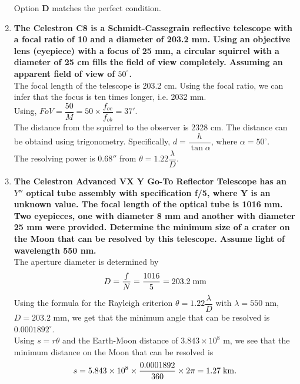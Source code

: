 \documentclass[a4paper,12pt]{extarticle}
\begin{document}
\begin{enumerate}
Option \textbf{D} matches the perfect condition.

\item \textbf{The Celestron C8 is a Schmidt-Cassegrain reflective telescope with a focal ratio of 10 and a diameter of 203.2 mm. Using an objective lens (eyepiece) with a focus of 25 mm, a circular squirrel with a diameter of 25 cm fills the field of view completely. Assuming an apparent field of view of $50^\circ$.}\\

The focal length of the telescope is 203.2 cm. Using the focal ratio, we can infer that the focus is ten times longer, i.e.
2032 mm.\\

Using, $FoV =\dfrac{50}{M}=50\times \dfrac{f_{oc}}{f_{ob}}=37'$.\\

The distance from the squirrel to the observer is 2328 cm. The distance can be obtaind using trigonometry. Specifically, $d=\dfrac{h}{\tan \alpha}$, where $\alpha = 50^\circ$.\\

The resolving power is $0.68''$ from $\theta =1.22\dfrac{\lambda}{D}$. \\

\item \textbf{The Celestron Advanced VX Y Go-To Reflector Telescope has an $Y''$ optical tube assembly with specification f/5, where Y is an unknown value. The focal length of the optical tube is 1016 mm. Two eyepieces, one with diameter 8 mm and another with diameter 25 mm were provided. Determine the minimum size of a crater on the Moon that can be resolved by this telescope. Assume light of wavelength 550 nm.}\\

The aperture diameter is determined by
$$D=\frac{f}{N}=\frac{1016}{5}= 203.2 \; \rm mm$$
Using the formula for the Rayleigh criterion $\theta =1.22\dfrac{\lambda}{D}$ with $\lambda= 550$ nm, $D = 203.2$ mm, we get that the minimum angle that can be resolved is $0.0001892^\circ$.\\

Using $s = r\theta$ and the Earth-Moon distance of $3.843\times 10^8$ m, we see that the minimum distance on the Moon that can be resolved is
$$s=5.843\times 10^8 \times  \frac{0.0001892}{360}\times 2\pi =1.27\; \rm km.$$
\end{enumerate}
\end{document}
